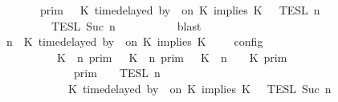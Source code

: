 \begin{isabellebody}
\ \ \ \ \ \ {\isacharequal}\ {\isasymlbrakk}{\isasymlbrakk}\ {\isasymGamma}\ {\isasymrbrakk}{\isasymrbrakk}\isactrlsub p\isactrlsub r\isactrlsub i\isactrlsub m\ {\isasyminter}\ {\isacharparenleft}{\isasymlbrakk}{\isasymlbrakk}\ {\isacharparenleft}K\ time{\isacharminus}delayed\ by\ {\isasymdelta}{\isasymtau}\ on\ K\ implies\ K\ {\isacharhash}\ {\isasymPsi}\ {\isasymrbrakk}{\isasymrbrakk}\isactrlsub T\isactrlsub E\isactrlsub S\isactrlsub L\isactrlbsup {\isasymge}\ n\isactrlesup \isanewline
\ \ \ \ \ \ \ \ {\isasyminter}\ {\isasymlbrakk}{\isasymlbrakk}\ {\isasymPhi}\ {\isasymrbrakk}{\isasymrbrakk}\isactrlsub T\isactrlsub E\isactrlsub S\isactrlsub L\isactrlbsup {\isasymge}\ Suc\ n\isactrlesup {\isacharparenright}{\isacartoucheclose}\isanewline
\ \ \ \ \ \ \isamarkupfalse%
\ {}\ \isamarkupfalse%
\ blast\isanewline
\ \ \ \ \isamarkupfalse%
\ {\isacartoucheopen}{\isasymlbrakk}\ {\isasymGamma}{\isacharcomma}\ n\ {\isasymturnstile}\ {\isacharparenleft}K\ time{\isacharminus}delayed\ by\ {\isasymdelta}{\isasymtau}\ on\ K\ implies\ K\ {\isacharhash}\ {\isasymPsi}\ {\isasymtriangleright}\ {\isasymPhi}\ {\isasymrbrakk}\isactrlsub c\isactrlsub o\isactrlsub n\isactrlsub f\isactrlsub i\isactrlsub g\isanewline
\ \ \ \ \ \ \ \ \ \ {\isacharequal}\ {\isacharparenleft}{\isasymlbrakk}\ K\ {\isasymnot}{\isasymUp}\ n\ {\isasymrbrakk}\isactrlsub p\isactrlsub r\isactrlsub i\isactrlsub m\ {\isasymunion}\ {\isasymlbrakk}\ K\ {\isasymUp}\ n\ {\isasymrbrakk}\isactrlsub p\isactrlsub r\isactrlsub i\isactrlsub m\ {\isasyminter}\ {\isasymlbrakk}\ K\ {\isacharat}\ n\ {\isasymoplus}\ {\isasymdelta}{\isasymtau}\ {\isasymRightarrow}\ K\ {\isasymrbrakk}\isactrlsub p\isactrlsub r\isactrlsub i\isactrlsub m{\isacharparenright}\isanewline
\ \ \ \ \ \ \ \ \ \ \ \ {\isasyminter}\ {\isacharparenleft}{\isasymlbrakk}{\isasymlbrakk}\ {\isasymGamma}\ {\isasymrbrakk}{\isasymrbrakk}\isactrlsub p\isactrlsub r\isactrlsub i\isactrlsub m\ {\isasyminter}\ {\isacharparenleft}{\isasymlbrakk}{\isasymlbrakk}\ {\isasymPsi}\ {\isasymrbrakk}{\isasymrbrakk}\isactrlsub T\isactrlsub E\isactrlsub S\isactrlsub L\isactrlbsup {\isasymge}\ n\isactrlesup \isanewline
\ \ \ \ \ \ \ \ \ \ \ \ {\isasyminter}\ {\isasymlbrakk}{\isasymlbrakk}\ {\isacharparenleft}K\ time{\isacharminus}delayed\ by\ {\isasymdelta}{\isasymtau}\ on\ K\ implies\ K\ {\isacharhash}\ {\isasymPhi}\ {\isasymrbrakk}{\isasymrbrakk}\isactrlsub T\isactrlsub E\isactrlsub S\isactrlsub L\isactrlbsup {\isasymge}\ Suc\ n\isactrlesup {\isacharparenright}{\isacharparenright}{\isacartoucheclose}\isanewline

\end{isabellebody}

